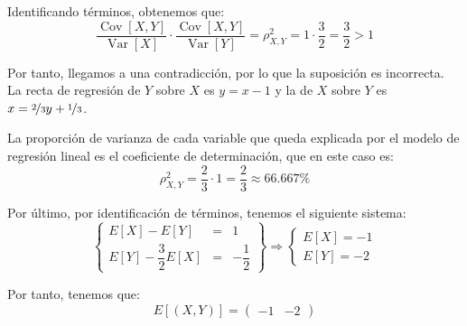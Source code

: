\documentclass[12pt]{article}
\DeclareMathOperator{\Var}{Var}
\DeclareMathOperator{\Cov}{Cov}
\begin{document}
\begin{ejercicio}
\begin{enumerate}
            Identificando términos, obtenemos que:
            \begin{equation*}
                \dfrac{\Cov[X,Y]}{\Var[X]}\cdot \dfrac{\Cov[X,Y]}{\Var[Y]} = \rho_{X,Y}^2 = 1\cdot \dfrac{3}{2} = \dfrac{3}{2}>1
            \end{equation*}

            Por tanto, llegamos a una contradicción, por lo que la suposición es incorrecta. La recta de regresión de $Y$ sobre $X$ es $y=x-1$ y la de $X$ sobre $Y$ es $x=\nicefrac{2}{3}y+\nicefrac{1}{3}$.

            La proporción de varianza de cada variable que queda explicada por el modelo de regresión lineal es el coeficiente de determinación, que en este caso es:
            \begin{equation*}
                \rho_{X,Y}^2 = \dfrac{2}{3}\cdot 1=\dfrac{2}{3}\approx 66.667\%
            \end{equation*}

            Por último, por identificación de términos, tenemos el siguiente sistema:
            \begin{equation*}
                \left\{\begin{array}{rcl}
                    E[X]-E[Y]&=&1 \\
                    E[Y]-\dfrac{3}{2}E[X]&=&-\dfrac{1}{2}
                \end{array}\right\}
                \Longrightarrow
                \begin{cases}
                    E[X]=-1 \\
                    E[Y]=-2
                \end{cases}
            \end{equation*}

            Por tanto, tenemos que:
            \begin{equation*}
                E[(X,Y)] = \begin{pmatrix}
                    -1 & -2
                \end{pmatrix}
            \end{equation*}
        \end{enumerate}
    \end{ejercicio}
\end{document}
